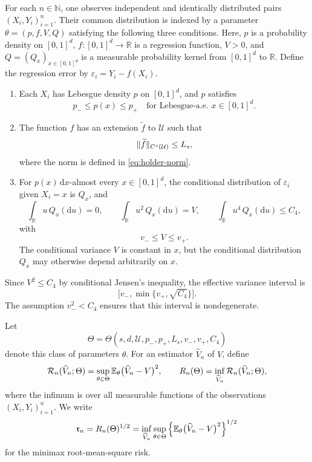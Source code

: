 For each \(n\in\mathbb N\), one observes independent and identically
distributed pairs \((X_i,Y_i)_{i=1}^n\).
Their common distribution is indexed by a parameter
\(\theta=(p,f,V,Q)\) satisfying the following three conditions.
Here, \(p\) is a probability density on \([0,1]^d\),
\(f\colon[0,1]^d\to\mathbb R\) is a regression function,
\(V>0\), and \(Q=(Q_x)_{x\in[0,1]^d}\) is a measurable
probability kernel from \([0,1]^d\) to \(\mathbb R\).
Define the regression error by
\(\varepsilon_i=Y_i-f(X_i)\).

\begin{enumerate}
\item[\textup{(i)}]
Each \(X_i\) has Lebesgue density \(p\) on \([0,1]^d\), and \(p\)
satisfies
\[
 p_-\le p(x)\le p_+
 \quad\text{for Lebesgue-a.e. }x\in[0,1]^d.
\]

\item[\textup{(ii)}]
The function \(f\) has an extension \(\widetilde f\) to
\(\mathcal U\) such that
\[
 \lVert\widetilde f\rVert_{C^s(\mathcal U)}\le L_s,
\]
where the norm is defined in \eqref{eq:holder-norm}.

\item[\textup{(iii)}]
For \(p(x)\,\mathrm dx\)-almost every \(x\in[0,1]^d\),
the conditional distribution of \(\varepsilon_i\) given \(X_i=x\)
is \(Q_x\), and
\[
 \int_{\mathbb R}u\,Q_x(\mathrm du)=0,\qquad
 \int_{\mathbb R}u^2\,Q_x(\mathrm du)=V,\qquad
 \int_{\mathbb R}u^4\,Q_x(\mathrm du)\le C_4,
\]
with
\[
 v_-\le V\le v_+.
\]
The conditional variance \(V\) is constant in \(x\), but the
conditional distribution \(Q_x\) may otherwise depend arbitrarily
on \(x\).
\end{enumerate}

Since \(V^2\le C_4\) by conditional Jensen's inequality, the
effective variance interval is
\[
 \bigl[v_-,\min\{v_+,\sqrt{C_4}\}\bigr].
\]
The assumption \(v_-^2<C_4\) ensures that this interval is
nondegenerate.

Let
\[
 \Theta
 =\Theta(s,d,\mathcal U,p_-,p_+,L_s,v_-,v_+,C_4)
\]
denote this class of parameters \(\theta\).
For an estimator \(\widehat V_n\) of \(V\), define
\[
 \mathcal R_n(\widehat V_n;\Theta)
 =
 \sup_{\theta\in\Theta}
 \mathbb E_\theta\bigl(\widehat V_n-V\bigr)^2,
 \qquad
 R_n(\Theta)
 =
 \inf_{\widehat V_n}
 \mathcal R_n(\widehat V_n;\Theta),
\]
where the infimum is over all measurable functions of the
observations \((X_i,Y_i)_{i=1}^n\).
We write
\[
 \mathfrak r_n
 =R_n(\Theta)^{1/2}
 =\inf_{\widehat V_n}\sup_{\theta\in\Theta}
   \left\{\mathbb E_\theta\bigl(\widehat V_n-V\bigr)^2\right\}^{1/2}
\]
for the minimax root-mean-square risk.

